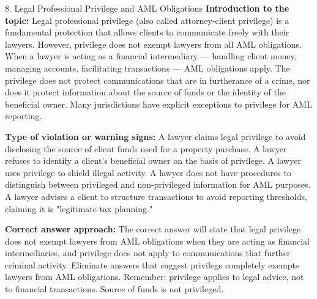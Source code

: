 \documentclass[11pt,a4paper]{beamer}
\begin{document}
\begin{frame}{8. Legal Professional Privilege and AML Obligations}
\tiny
\noindent\textbf{Introduction to the topic:} Legal professional privilege (also called attorney-client privilege) is a fundamental protection that allows clients to communicate freely with their lawyers. However, privilege does not exempt lawyers from all AML obligations. When a lawyer is acting as a financial intermediary — handling client money, managing accounts, facilitating transactions — AML obligations apply. The privilege does not protect communications that are in furtherance of a crime, nor does it protect information about the source of funds or the identity of the beneficial owner. Many jurisdictions have explicit exceptions to privilege for AML reporting.

\vspace{0.1cm}
\noindent\textbf{Type of violation or warning signs:} A lawyer claims legal privilege to avoid disclosing the source of client funds used for a property purchase. A lawyer refuses to identify a client's beneficial owner on the basis of privilege. A lawyer uses privilege to shield illegal activity. A lawyer does not have procedures to distinguish between privileged and non-privileged information for AML purposes. A lawyer advises a client to structure transactions to avoid reporting thresholds, claiming it is "legitimate tax planning."

\vspace{0.1cm}
\noindent\textbf{Correct answer approach:} The correct answer will state that legal privilege does not exempt lawyers from AML obligations when they are acting as financial intermediaries, and privilege does not apply to communications that further criminal activity. Eliminate answers that suggest privilege completely exempts lawyers from AML obligations. Remember: privilege applies to legal advice, not to financial transactions. Source of funds is not privileged.
\end{frame}
\end{document}
